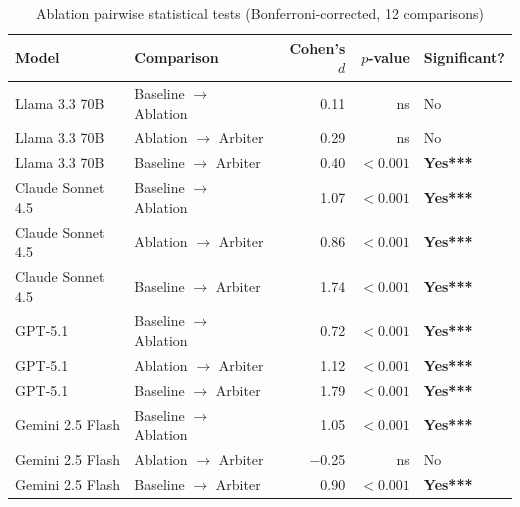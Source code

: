 \begin{table}[!ht]
\centering
\caption{Ablation pairwise statistical tests (Bonferroni-corrected, 12 comparisons)}
\label{tab:ablation-stats}
\small
\begin{tabular}{llrrl}
\toprule
\textbf{Model} & \textbf{Comparison} & \textbf{Cohen's $d$} & \textbf{$p$-value} & \textbf{Significant?} \\
\midrule
Llama 3.3 70B & Baseline $\rightarrow$ Ablation & 0.11 & ns & No \\
Llama 3.3 70B & Ablation $\rightarrow$ Arbiter & 0.29 & ns & No \\
Llama 3.3 70B & Baseline $\rightarrow$ Arbiter & 0.40 & $<0.001$ & \textbf{Yes***} \\
\midrule
Claude Sonnet 4.5 & Baseline $\rightarrow$ Ablation & 1.07 & $<0.001$ & \textbf{Yes***} \\
Claude Sonnet 4.5 & Ablation $\rightarrow$ Arbiter & 0.86 & $<0.001$ & \textbf{Yes***} \\
Claude Sonnet 4.5 & Baseline $\rightarrow$ Arbiter & 1.74 & $<0.001$ & \textbf{Yes***} \\
\midrule
GPT-5.1 & Baseline $\rightarrow$ Ablation & 0.72 & $<0.001$ & \textbf{Yes***} \\
GPT-5.1 & Ablation $\rightarrow$ Arbiter & 1.12 & $<0.001$ & \textbf{Yes***} \\
GPT-5.1 & Baseline $\rightarrow$ Arbiter & 1.79 & $<0.001$ & \textbf{Yes***} \\
\midrule
Gemini 2.5 Flash & Baseline $\rightarrow$ Ablation & 1.05 & $<0.001$ & \textbf{Yes***} \\
Gemini 2.5 Flash & Ablation $\rightarrow$ Arbiter & $-$0.25 & ns & No \\
Gemini 2.5 Flash & Baseline $\rightarrow$ Arbiter & 0.90 & $<0.001$ & \textbf{Yes***} \\
\bottomrule
\end{tabular}
\end{table}
